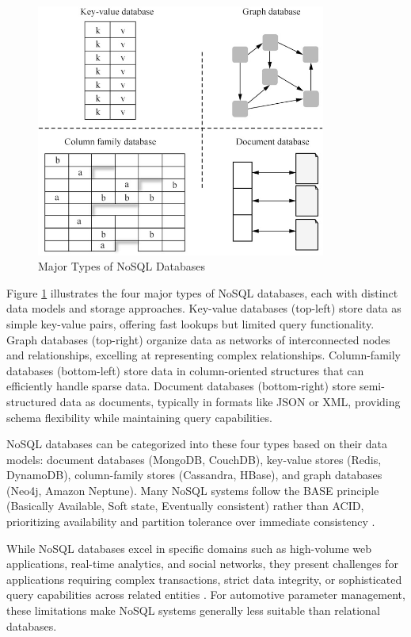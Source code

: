 \begin{figure}[ht]
    \centering
    \includegraphics[width=0.85\textwidth]{figures/nosql_types.png}
    \caption{Major Types of NoSQL Databases \cite{gaussdbdatabase}}
    \label{fig:nosql-types}
\end{figure}

Figure \ref{fig:nosql-types} illustrates the four major types of \ac{NoSQL} databases, each with distinct data models and storage approaches. Key-value databases (top-left) store data as simple key-value pairs, offering fast lookups but limited query functionality. Graph databases (top-right) organize data as networks of interconnected nodes and relationships, excelling at representing complex relationships. Column-family databases (bottom-left) store data in column-oriented structures that can efficiently handle sparse data. Document databases (bottom-right) store semi-structured data as documents, typically in formats like JSON or XML, providing schema flexibility while maintaining query capabilities.

NoSQL databases can be categorized into these four types based on their data models: document databases (MongoDB, CouchDB), key-value stores (Redis, DynamoDB), column-family stores (Cassandra, HBase), and graph databases (Neo4j, Amazon Neptune). Many NoSQL systems follow the BASE principle (Basically Available, Soft state, Eventually consistent) rather than ACID, prioritizing availability and partition tolerance over immediate consistency \cite{brewer2000towards}.

While NoSQL databases excel in specific domains such as high-volume web applications, real-time analytics, and social networks, they present challenges for applications requiring complex transactions, strict data integrity, or sophisticated query capabilities across related entities \cite{kleppmann2017conflict}. For automotive parameter management, these limitations make NoSQL systems generally less suitable than relational databases.

